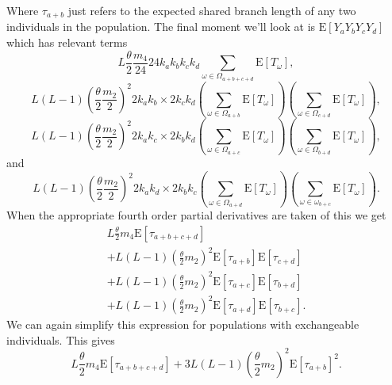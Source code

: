 \documentclass{article}
\newcommand{\T}{\frac{\theta}{2}}
\newcommand{\E}{\mathrm{E}}
\begin{document}
Where $\tau_{a+b}$ just refers to the expected shared branch length of any two
individuals in the population. The final moment we'll look at is
$\E[Y_aY_bY_cY_d]$ which has relevant terms
\begin{equation*}
  L \T \frac{m_4}{24} 24k_ak_bk_ck_d \sum_{\omega \in \Omega_{a+b+c+d}} \E[T_\omega],
\end{equation*}
\begin{equation*}
  L(L-1) \left(\T \frac{m_2}{2}\right)^2 2k_ak_b \times 2k_ck_d \left( \sum_{\omega \in \Omega_{a+b}} \E[T_\omega] \right)
  \left( \sum_{\omega \in \Omega_{c+d}} \E[T_\omega] \right),
\end{equation*}
\begin{equation*}
  L(L-1) \left(\T \frac{m_2}{2}\right)^2 2k_ak_c \times 2k_bk_d \left( \sum_{\omega \in \Omega_{a+c}} \E[T_\omega] \right)
  \left( \sum_{\omega \in \Omega_{b+d}} \E[T_\omega] \right),
\end{equation*}
and
\begin{equation*}
  L(L-1) \left(\T \frac{m_2}{2}\right)^2 2k_ak_d \times 2k_bk_c \left( \sum_{\omega \in \Omega_{a+d}} \E[T_\omega] \right)
  \left( \sum_{\omega \in \omega_{b+c}} \E[T_\omega] \right).
\end{equation*}
When the appropriate fourth order partial derivatives are taken of this we get
\begin{align*}
  L \T m_4 \E[\tau_{a+b+c+d}] \\
  + L(L-1)\left(\T m_2\right)^2\E[\tau_{a+b}]\E[\tau_{c+d}] \\
  + L(L-1)\left(\T m_2\right)^2\E[\tau_{a+c}]\E[\tau_{b+d}] \\
  + L(L-1)\left(\T m_2\right)^2\E[\tau_{a+d}]\E[\tau_{b+c}].
\end{align*}
We can again simplify this expression for populations with exchangeable
individuals. This gives
\begin{equation}
  \label{eq:m1111}
  L \T m_4 \E[\tau_{a+b+c+d}] + 3L(L-1)\left(\T m_2\right)^2\E[\tau_{a+b}]^2.
\end{equation}
\end{document}
